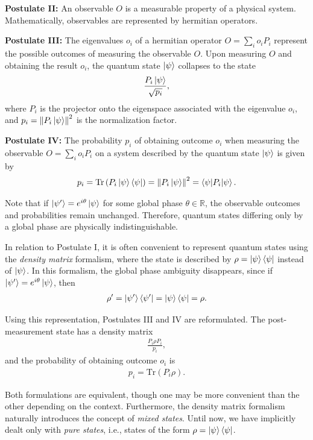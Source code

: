 \documentclass[12pt,letterpaper]{article}
\begin{document}
\begin{multicols}{2}
\textbf{Postulate II:} An observable $O$ is a measurable property of a physical system. Mathematically, observables are represented by hermitian operators.

\textbf{Postulate III:} The eigenvalues $o_i$ of a hermitian operator $O = \sum_{i} o_i P_i$ represent the possible outcomes of measuring the observable $O$. Upon measuring $O$ and obtaining the result $o_i$, the quantum state $\ket{\psi}$ collapses to the state
\begin{align*}
	\frac{P_i\ket{\psi}}{\sqrt{p_i}},
\end{align*}
where $P_i$ is the projector onto the eigenspace associated with the eigenvalue $o_i$, and $p_i = \left\|P_i\ket{\psi}\right\|^2$ is the normalization factor.

\textbf{Postulate IV:} The probability $p_i$ of obtaining outcome $o_i$ when measuring the observable $O = \sum_{i} o_i P_i$ on a system described by the quantum state $\ket{\psi}$ is given by
\begin{align*}
	p_i = \text{Tr}\left(P_i \ket{\psi}\bra{\psi}\right) = \left\|P_i\ket{\psi}\right\|^2 = \braket{\psi|P_i|\psi}.
\end{align*}

Note that if $\ket{\psi'} = e^{i\theta}\ket{\psi}$ for some global phase $\theta \in \mathbb{R}$, the observable outcomes and probabilities remain unchanged. Therefore, quantum states differing only by a global phase are physically indistinguishable.

In relation to Postulate I, it is often convenient to represent quantum states using the \emph{density matrix} formalism, where the state is described by $\rho = \ket{\psi}\bra{\psi}$ instead of $\ket{\psi}$. In this formalism, the global phase ambiguity disappears, since if $\ket{\psi'} = e^{i\theta}\ket{\psi}$, then
\begin{align*}
	\rho' = \ket{\psi'}\bra{\psi'} = \ket{\psi}\bra{\psi} = \rho.
\end{align*}

Using this representation, Postulates III and IV are reformulated. The post-measurement state has a density matrix
\begin{align*}
	\frac{P_i \rho P_i}{p_i},
\end{align*}
and the probability of obtaining outcome $o_i$ is
\begin{align*}
	p_i = \text{Tr}(P_i \rho).
\end{align*}

Both formulations are equivalent, though one may be more convenient than the other depending on the context. Furthermore, the density matrix formalism naturally introduces the concept of \emph{mixed states}. Until now, we have implicitly dealt only with \emph{pure states}, i.e., states of the form $\rho = \ket{\psi}\bra{\psi}$. 


\end{multicols}
\end{document}
